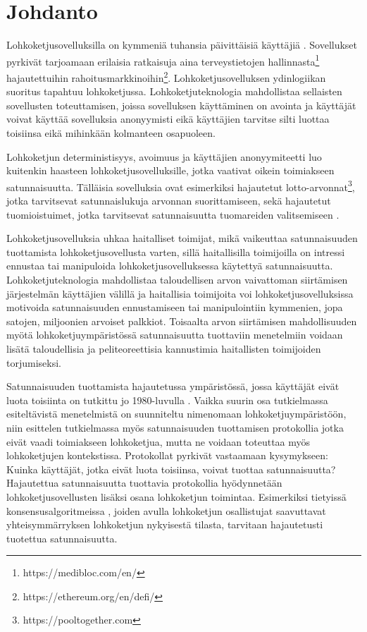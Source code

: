 \chapter{Johdanto\label{intro}}

Lohkoketjusovelluksilla on kymmeniä tuhansia päivittäisiä käyttäjiä \cite{noauthor_state_nodate}. Sovellukset pyrkivät tarjoamaan erilaisia ratkaisuja aina terveystietojen hallinnasta\footnote{https://medibloc.com/en/} hajautettuihin rahoitusmarkkinoihin\footnote{https://ethereum.org/en/defi/}. Lohkoketjusovelluksen ydinlogiikan suoritus tapahtuu lohkoketjussa. Lohkoketjuteknologia mahdollistaa sellaisten sovellusten toteuttamisen, joissa sovelluksen käyttäminen on avointa ja käyttäjät voivat käyttää sovelluksia anonyymisti eikä käyttäjien tarvitse silti luottaa toisiinsa eikä mihinkään kolmanteen osapuoleen.

Lohkoketjun deterministisyys, avoimuus ja käyttäjien anonyymiteetti luo kuitenkin haasteen lohkoketjusovelluksille, jotka vaativat oikein toimiakseen satunnaisuutta. Tälläisia sovelluksia ovat esimerkiksi hajautetut lotto-arvonnat\footnote{https://pooltogether.com}, jotka tarvitsevat satunnaislukuja arvonnan suorittamiseen, sekä hajautetut tuomioistuimet, jotka tarvitsevat satunnaisuutta tuomareiden valitsemiseen \cite{lesaege_kleros_2020}. 

Lohkoketjusovelluksia uhkaa haitalliset toimijat, mikä vaikeuttaa satunnaisuuden tuottamista lohkoketjusovellusta varten, sillä haitallisilla toimijoilla on intressi ennustaa tai manipuloida lohkoketjusovelluksessa käytettyä satunnaisuutta. Lohkoketjuteknologia mahdollistaa taloudellisen arvon vaivattoman siirtämisen järjestelmän käyttäjien välillä ja haitallisia toimijoita voi lohkoketjusovelluksissa motivoida satunnaisuuden ennustamiseen tai manipulointiin kymmenien, jopa satojen, miljoonien arvoiset palkkiot. Toisaalta arvon siirtämisen mahdollisuuden myötä lohkoketjuympäristössä satunnaisuutta tuottaviin menetelmiin voidaan lisätä taloudellisia ja peliteoreettisia kannustimia haitallisten toimijoiden torjumiseksi.

Satunnaisuuden tuottamista hajautetussa ympäristössä, jossa käyttäjät eivät luota toisiinta on tutkittu jo 1980-luvulla \cite{10.1145/1008908.1008911}. Vaikka suurin osa tutkielmassa esiteltävistä menetelmistä on suunniteltu nimenomaan lohkoketjuympäristöön, niin esittelen tutkielmassa myös satunnaisuuden tuottamisen protokollia jotka eivät vaadi toimiakseen lohkoketjua, mutta ne voidaan toteuttaa myös lohkoketjujen kontekstissa. Protokollat pyrkivät vastaamaan kysymykseen: Kuinka käyttäjät, jotka eivät luota toisiinsa, voivat tuottaa satunnaisuutta? Hajautettua satunnaisuutta tuottavia protokollia hyödynnetään lohkoketjusovellusten lisäksi osana lohkoketjun toimintaa. Esimerkiksi tietyissä konsensusalgoritmeissa \cite{gilad_algorand_2017, hanke_dfinity_2018}, joiden avulla lohkoketjun osallistujat saavuttavat yhteisymmärryksen lohkoketjun nykyisestä tilasta, tarvitaan hajautetusti tuotettua satunnaisuutta.

